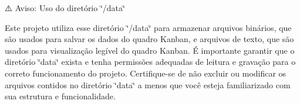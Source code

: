 ⚠️ Aviso\+: Uso do diretório \char`\"{}/data\char`\"{}

Este projeto utiliza esse diretório \char`\"{}/data\char`\"{} para armazenar arquivos binários, que são usados para salvar os dados do quadro Kanban, e arquivos de texto, que são usados para visualização legível do quadro Kanban. É importante garantir que o diretório \char`\"{}data\char`\"{} exista e tenha permissões adequadas de leitura e gravação para o correto funcionamento do projeto. Certifique-\/se de não excluir ou modificar os arquivos contidos no diretório \char`\"{}data\char`\"{} a menos que você esteja familiarizado com sua estrutura e funcionalidade. 